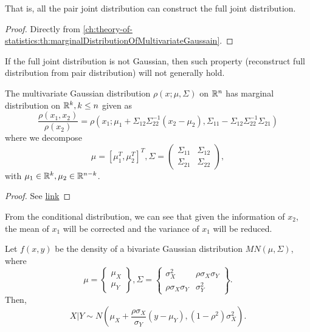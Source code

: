 \begin{refsection}
\begin{lemma}
That is, all the pair joint distribution can construct the full joint distribution. 	
\end{lemma}
\begin{proof}
Directly from \autoref{ch:theory-of-statistics:th:marginalDistributionOfMultivariateGaussain}.	
\end{proof}

\begin{remark}
If the full joint distribution is not Gaussian, then such property (reconstruct full distribution from pair distribution) will not generally hold.	
\end{remark}


\begin{theorem}
	\cite[43]{chirikjian2011stochastic1}\label{ch:theory-of-statistics:th:multivariatenormalconditionaldistribution}
	The multivariate Gaussian distribution $\rho(x;\mu,\Sigma)$ on $\mathbb{R}^n$ has marginal distribution on $\mathbb{R}^k,k\leq n$ given as
	$$\frac{\rho(x_1,x_2)}{\rho(x_2)} = \rho(x_1;\mu_1 + \Sigma_{12}\Sigma_{22}^{-1}(x_2-\mu_2),\Sigma_{11} - \Sigma_{12}\Sigma_{22}^{-1}\Sigma_{21})$$
	where we decompose $$\mu = [\mu_1^T ,\mu_2^T]^T,\Sigma = 
	\begin{pmatrix}
	\Sigma_{11} & \Sigma_{12} \\
	\Sigma_{21} & \Sigma_{22}
	\end{pmatrix}
	,$$ 
	with $\mu_1 \in \mathbb{R}^k,\mu_2\in \mathbb{R}^{n-k}$.
\end{theorem}
\begin{proof}
See \href{http://fourier.eng.hmc.edu/e161/lectures/gaussianprocess/node7.html}{link}
\end{proof}

\begin{remark}
	From the conditional distribution, we can see that given the information of $x_2$, the mean of $x_1$ will be corrected and the variance of $x_1$ will be reduced. 
\end{remark}

\begin{example}
	Let $f(x,y)$ be the density of a bivariate Gaussian distribution $MN(\mu,\Sigma)$, where
	$$\mu = \begin{Bmatrix}
	\mu_X\\
	\mu_Y
	\end{Bmatrix}, \Sigma = \begin{Bmatrix}
	\sigma_X^2 & \rho \sigma_X\sigma_Y \\
	\rho \sigma_X\sigma_Y & \sigma_Y^2
	\end{Bmatrix}.$$
	Then,
	$$X|Y \sim N(\mu_X + \frac{\rho \sigma_X}{\sigma_Y}(y-\mu_Y), (1-\rho^2)\sigma_X^2).$$	
\end{example}



\end{refsection}
